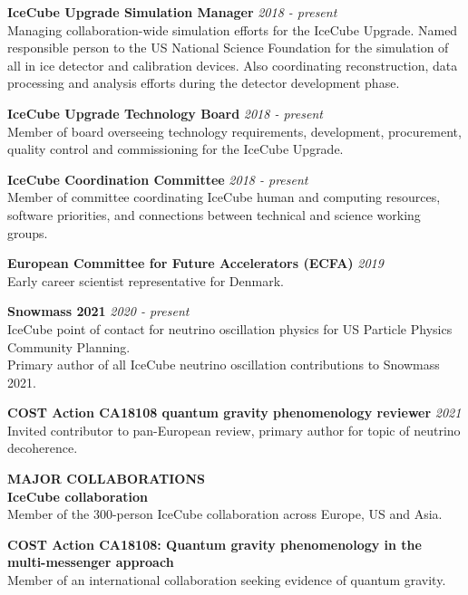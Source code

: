 \documentclass[a4paper,11pt]{article}
\renewcommand{\smallskip} {\vspace{0.1in}}
\begin{document}
{\bf IceCube Upgrade Simulation Manager} \hfill {\em 2018 - present} \\ 
Managing collaboration-wide simulation efforts for the IceCube Upgrade. Named responsible person to the US National Science Foundation for the simulation of all in ice detector and calibration devices. Also coordinating reconstruction, data processing and analysis efforts during the detector development phase.

{\bf IceCube Upgrade Technology Board} \hfill {\em 2018 - present} \\ 
Member of board overseeing technology requirements, development, procurement, quality control and commissioning for the IceCube Upgrade.

{\bf IceCube Coordination Committee} \hfill {\em 2018 - present} \\ 
Member of committee coordinating IceCube human and computing resources, software priorities, and connections between technical and science working groups.

{\bf European Committee for Future Accelerators (ECFA) } \hfill {\em 2019} \\ 
Early career scientist representative for Denmark.

{\bf Snowmass 2021 } \hfill {\em 2020 - present} \\ 
IceCube point of contact for neutrino oscillation physics for US Particle Physics Community Planning. \\
Primary author of all IceCube neutrino oscillation contributions to Snowmass 2021.

{\bf COST Action CA18108 quantum gravity phenomenology reviewer  } \hfill {\em 2021} \\ 
Invited contributor to pan-European review, primary author for topic of neutrino decoherence.

\vspace{0.2cm}
\textbf{MAJOR COLLABORATIONS ~~\hrulefill}\smallskip\\
%
{\bf IceCube collaboration} \\ 
Member of the 300-person IceCube collaboration across Europe, US and Asia.

{\bf COST Action CA18108: Quantum gravity phenomenology in the multi-messenger approach} \\ 
Member of an international collaboration seeking evidence of quantum gravity.
\end{document}

